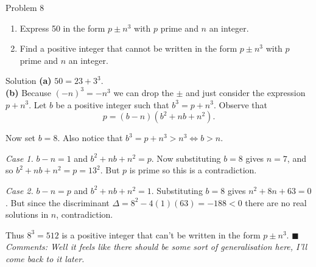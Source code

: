 \documentclass{article}
\begin{document}
\begin{problem}{Problem 8}
\begin{enumerate}[label=(\alph*)]
\item Express 50 in the form $p \pm n^3$ with $p$ prime and $n$ an integer.
\item Find a positive integer that cannot be written in the form
$p \pm n^3$ with $p$ prime and $n$ an integer.
\end{enumerate}
\end{problem}

\begin{solution}{Solution}
\textbf{(a)} $50 = 23 + 3^3$.\\

\textbf{(b)} Because $(-n)^3=-n^3$ we can drop the $\pm$ and just consider
the expression $p + n^3$. Let $b$ be a positive integer such that
$b^3 = p + n^3$. Observe that
$$
p = (b-n)(b^2 + nb + n^2).
$$

Now set $b=8$. Also notice that $b^3 = p + n^3 > n^3 \iff b > n$.
\vspace{0.2cm}

\textit{Case 1.} $b-n = 1$ and $b^2 + nb + n^2 = p$. Now substituting
$b=8$ gives $n = 7$, and so $b^2+nb+n^2 = p = 13^2$. But $p$ is
prime so this is a contradiction. \vspace{0.2cm}

\textit{Case 2.} $b-n = p$ and $b^2 + nb + n^2 = 1$. Substituting $b=8$
gives $n^2 + 8n + 63 = 0$. But since the discriminant
$\Delta = 8^2 - 4(1)(63) = -188 < 0$
there are no real solutions in $n$, contradiction.\vspace{0.2cm}

Thus $8^3 = 512$ is a positive integer that can't be written in the
form $p \pm n^3$. $\blacksquare$ \\

\textit{Comments: Well it feels like there should be some sort of
generalisation here, I'll come back to it later.
}
\end{solution}
\end{document}
